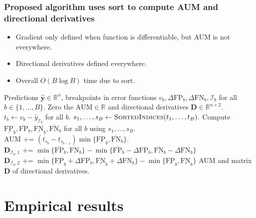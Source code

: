 \documentclass{beamer}
\begin{document}
\begin{frame}
  \frametitle{Proposed algorithm uses sort to compute AUM and directional derivatives}

  \begin{itemize}
  \item Gradient only defined when function is differentiable, but AUM
    is not everywhere.
  \item Directional derivatives defined everywhere.
  \item Overall $O(B\log B)$ time due to sort.
  \end{itemize}
  
\small
\begin{algorithmic}[1]
  Predictions $\mathbf{\hat y}\in\mathbb R^n$, 
  breakpoints in error functions $v_b,\Delta\text{FP}_b,\Delta\text{FN}_b,\mathcal I_b$ for all $b\in\{1,\dots,B\}$.
  \STATE Zero the $\text{AUM}\in\mathbb R$ and directional derivatives $\mathbf D\in\mathbb R^{n\times 2}$.\label{line:init-zero}
  \STATE $t_b\gets v_b - \hat y_{\mathcal I_b}$ for all $b$.\label{line:compute-thresh}
  \STATE $s_1,\dots,s_B\gets \textsc{SortedIndices}(t_1,\dots,t_B).$\label{line:sorted-indices}
  \STATE Compute $\underline{\text{FP}}_b,\overline{\text{FP}}_b,\underline{\text{FN}}_b,\overline{\text{FN}}_b$ for all $b$ using $s_1,\dots,s_B$.
  \label{line:for-intervals}
  \STATE $\text{AUM} \text{ += } (t_{s_b} - t_{s_{b-1}}) \min\{\underline{\text{FP}}_b, \overline{\text{FN}}_b\} $.\label{line:AUM}
  \ENDFOR
  \label{line:for-breakpoints}
  \STATE\label{line:D_lo} $\mathbf D_{\mathcal I_b,1} \text{ += } \min\{
  \overline{\text{FP}}_b , 
  \overline{\text{FN}}_b 
  \}
  -
  \min\{
  \overline{\text{FP}}_b - \Delta\text{FP}_b, 
  \overline{\text{FN}}_b - \Delta\text{FN}_b
  \}$
  \STATE\label{line:D_hi} $\mathbf D_{\mathcal I_b,2} \text{ += } \min\{
  \underline{\text{FP}}_b + \Delta\text{FP}_b, 
  \underline{\text{FN}}_b + \Delta\text{FN}_b
  \}
  -
  \min\{
  \underline{\text{FP}}_b , 
  \underline{\text{FN}}_b 
  \}$
  \ENDFOR
   AUM and matrix $\mathbf D$ of directional derivatives.
\end{algorithmic}

\end{frame}
\section{Empirical results}
\end{document}
